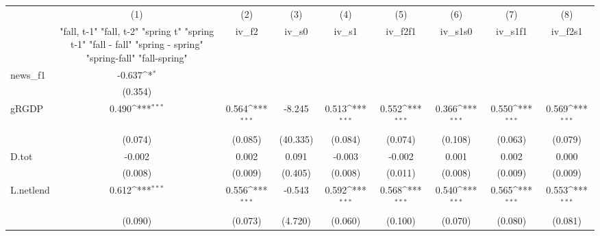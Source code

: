 {
\def\sym#1{\ifmmode^{#1}\else\(^{#1}\)\fi}
\begin{tabular}{l*{8}{c}}
\toprule
            &\multicolumn{1}{c}{(1)}&\multicolumn{1}{c}{(2)}&\multicolumn{1}{c}{(3)}&\multicolumn{1}{c}{(4)}&\multicolumn{1}{c}{(5)}&\multicolumn{1}{c}{(6)}&\multicolumn{1}{c}{(7)}&\multicolumn{1}{c}{(8)}\\
            &\multicolumn{1}{c}{  "fall, t-1" "fall, t-2" "spring t" "spring t-1"  "fall - fall" "spring - spring" "spring-fall" "fall-spring" }&\multicolumn{1}{c}{iv\_f2}&\multicolumn{1}{c}{iv\_s0}&\multicolumn{1}{c}{iv\_s1}&\multicolumn{1}{c}{iv\_f2f1}&\multicolumn{1}{c}{iv\_s1s0}&\multicolumn{1}{c}{iv\_s1f1}&\multicolumn{1}{c}{iv\_f2s1}\\
\midrule
news\_f1     &      -0.637\sym{*}  &                     &                     &                     &                     &                     &                     &                     \\
            &     (0.354)         &                     &                     &                     &                     &                     &                     &                     \\
\addlinespace
gRGDP       &       0.490\sym{***}&       0.564\sym{***}&      -8.245         &       0.513\sym{***}&       0.552\sym{***}&       0.366\sym{***}&       0.550\sym{***}&       0.569\sym{***}\\
            &     (0.074)         &     (0.085)         &    (40.335)         &     (0.084)         &     (0.074)         &     (0.108)         &     (0.063)         &     (0.079)         \\
\addlinespace
D.tot       &      -0.002         &       0.002         &       0.091         &      -0.003         &      -0.002         &       0.001         &       0.002         &       0.000         \\
            &     (0.008)         &     (0.009)         &     (0.405)         &     (0.008)         &     (0.011)         &     (0.008)         &     (0.009)         &     (0.009)         \\
\addlinespace
L.netlend   &       0.612\sym{***}&       0.556\sym{***}&      -0.543         &       0.592\sym{***}&       0.568\sym{***}&       0.540\sym{***}&       0.565\sym{***}&       0.553\sym{***}\\
            &     (0.090)         &     (0.073)         &     (4.720)         &     (0.060)         &     (0.100)         &     (0.070)         &     (0.080)         &     (0.081)         \\

\end{tabular}}
